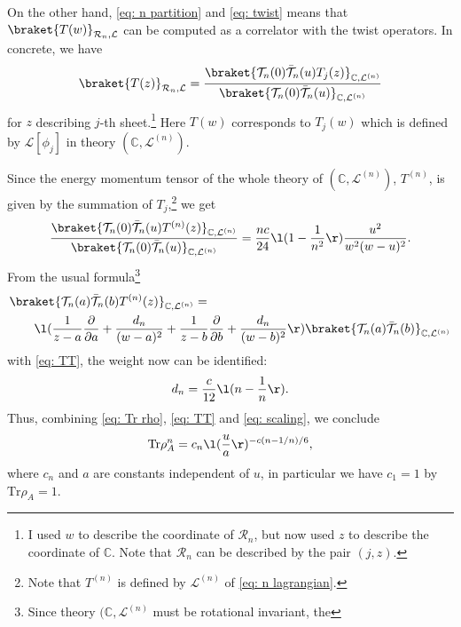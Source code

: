 \documentclass[12pt]{article}
\begin{document}
On the other hand, \eqref{eq: n partition} and \eqref{eq: twist} means that $\braket{T(w)}_{\mathcal R_n,\mathcal L}$ can be computed as a correlator with the twist operators.
In concrete, we have 
\begin{align}
	\braket{T(z)}_{\mathcal R_n,\mathcal L} 
	= \frac{\braket{\mathcal T_n(0)\bar{\mathcal T}_n(u)T_j(z)}_{\mathbb C,\mathcal L^{(n)}}}
	{\braket{\mathcal T_n(0)\bar{\mathcal T}_n(u)}_{\mathbb C,\mathcal L^{(n)}}}
\end{align}
for $z$ describing $j$-th sheet.\footnote{
I used $w$ to describe the coordinate of $\mathcal R_n$, but now used $z$ to describe the coordinate of $\mathbb C$.
Note that $\mathcal R_n$ can be described by the pair $(j,z)$.
}
Here $T(w)$ corresponds to $T_j(w)$ which is defined by $\mathcal L[\phi_j]$ in theory $(\mathbb C,\mathcal L^{(n)})$.

Since the energy momentum tensor of the whole theory of $(\mathbb C,\mathcal L^{(n)})$, $T^{(n)}$, is given by the summation of $T_j$,\footnote{
Note that $T^{(n)}$ is defined by $\mathcal L^{(n)}$ of \eqref{eq: n lagrangian}.
}
we get
\begin{align}
	\frac{\braket{\mathcal T_n(0)\bar{\mathcal T}_n(u)T^{(n)}(z)}_{\mathbb C,\mathcal L^{(n)}}}
	{\braket{\mathcal T_n(0)\bar{\mathcal T}_n(u)}_{\mathbb C,\mathcal L^{(n)}}}
	=
	\frac{nc}{24}\l(1-\frac{1}{n^2}\r)\frac{u^2}{w^2(w-u)^2}.
\end{align}
From the usual formula\footnote{Since theory $(\mathbb C,\mathcal L^{(n)}$ must be rotational invariant, the}
\begin{align}
	&\braket{\mathcal T_n(a)\bar{\mathcal T}_n(b)T^{(n)}(z)}_{\mathbb C,\mathcal L^{(n)}}=\nonumber\\
	&\qquad
	\l(\frac{1}{z-a}\frac{\partial}{\partial a} + \frac{d_n}{(w-a)^2}
	+\frac{1}{z-b}\frac{\partial}{\partial b} + \frac{d_n}{(w-b)^2} \r)
	\braket{\mathcal T_n(a)\bar{\mathcal T}_n(b)}_{\mathbb C,\mathcal L^{(n)}}
\end{align}
with \eqref{eq: TT}, the weight now can be identified:
\begin{align}
	d_n = \frac{c}{12}\l(n-\frac{1}{n}\r).\label{eq: scaling}
\end{align}
Thus, combining \eqref{eq: Tr rho}, \eqref{eq: TT} and \eqref{eq: scaling}, we conclude
\begin{align}
	\mathrm{Tr}\rho_A^n = c_n\l(\frac{u}{a}\r)^{-c(n-1/n)/6},
\end{align}
where $c_n$ and $a$ are constants independent of $u$, in particular we have $c_1=1$ by $\mathrm{Tr}\rho_A = 1$.
\end{document}
